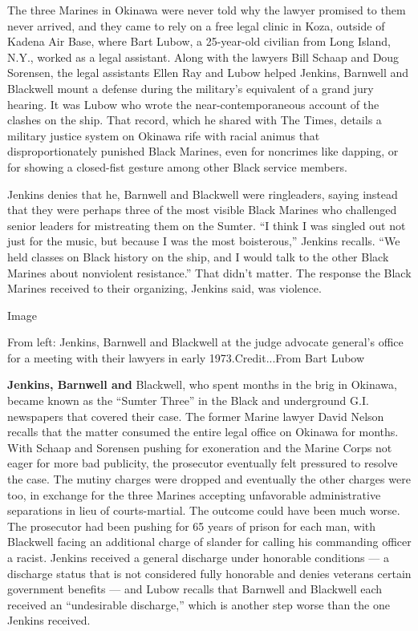 The three Marines in Okinawa were never told why the lawyer promised to
them never arrived, and they came to rely on a free legal clinic in
Koza, outside of Kadena Air Base, where Bart Lubow, a 25-year-old
civilian from Long Island, N.Y., worked as a legal assistant. Along with
the lawyers Bill Schaap and Doug Sorensen, the legal assistants Ellen
Ray and Lubow helped Jenkins, Barnwell and Blackwell mount a defense
during the military's equivalent of a grand jury hearing. It was Lubow
who wrote the near-contemporaneous account of the clashes on the ship.
That record, which he shared with The Times, details a military justice
system on Okinawa rife with racial animus that disproportionately
punished Black Marines, even for noncrimes like dapping, or for showing
a closed-fist gesture among other Black service members.

Jenkins denies that he, Barnwell and Blackwell were ringleaders, saying
instead that they were perhaps three of the most visible Black Marines
who challenged senior leaders for mistreating them on the Sumter. ``I
think I was singled out not just for the music, but because I was the
most boisterous,'' Jenkins recalls. ``We held classes on Black history
on the ship, and I would talk to the other Black Marines about
nonviolent resistance.'' That didn't matter. The response the Black
Marines received to their organizing, Jenkins said, was violence.

Image

From left: Jenkins, Barnwell and Blackwell at the judge advocate
general's office for a meeting with their lawyers in early
1973.Credit...From Bart Lubow

\textbf{Jenkins, Barnwell and} Blackwell, who spent months in the brig
in Okinawa, became known as the ``Sumter Three'' in the Black and
underground G.I. newspapers that covered their case. The former Marine
lawyer David Nelson recalls that the matter consumed the entire legal
office on Okinawa for months. With Schaap and Sorensen pushing for
exoneration and the Marine Corps not eager for more bad publicity, the
prosecutor eventually felt pressured to resolve the case. The mutiny
charges were dropped and eventually the other charges were too, in
exchange for the three Marines accepting unfavorable administrative
separations in lieu of courts-martial. The outcome could have been much
worse. The prosecutor had been pushing for 65 years of prison for each
man, with Blackwell facing an additional charge of slander for calling
his commanding officer a racist. Jenkins received a general discharge
under honorable conditions --- a discharge status that is not considered
fully honorable and denies veterans certain government benefits --- and
Lubow recalls that Barnwell and Blackwell each received an ``undesirable
discharge,'' which is another step worse than the one Jenkins received.

